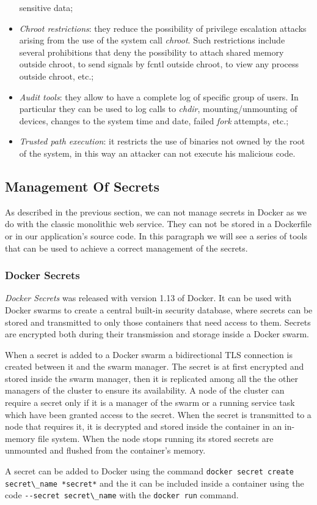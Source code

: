 \documentclass[a4paper,12pt]{article}
\newcommand{\code}[1]{\lstinline|#1|}
\begin{document}
\begin{itemize}
  sensitive data;
  \item \textit{Chroot restrictions}: they reduce the possibility of privilege escalation
  attacks arising from the use of the system call \textit{chroot}. Such
  restrictions include several prohibitions that deny the possibility to
  attach shared memory outside chroot, to send signals by fcntl outside chroot,
  to view any process outside chroot, etc.;
  \item \textit{Audit tools}: they allow to have a complete log of specific group of
  users. In particular they can be used to log calls to \textit{chdir},
  mounting/unmounting of devices, changes to the system time and date, failed
  \textit{fork} attempts, etc.;
  \item \textit{Trusted path execution}: it restricts the use of binaries not owned by
  the root of the system, in this way an attacker can not execute his malicious
  code.
\end{itemize}

\subsection{Management Of Secrets}

As described in the previous section, we can not manage secrets in Docker as we
do with the classic monolithic web service. They can not be stored in a
Dockerfile or in our application's source code. In this paragraph we will see a
series of tools that can be used to achieve a correct management of the secrets.

\subsubsection{Docker Secrets}

\textit{Docker Secrets} \cite{docker_secrets} was released with version 1.13 of
Docker. It can be used with Docker swarms to create a central built-in security
database, where secrets can be stored and transmitted to only those containers
that need access to them. Secrets are encrypted both during their transmission
and storage inside a Docker swarm. \par When a secret is added to a Docker swarm
a bidirectional TLS connection is created between it and the swarm manager. The
secret is at first encrypted and stored inside the swarm manager, then it is
replicated among all the the other managers of the cluster to ensure its
availability. A node of the cluster can require a secret only if it is a manager
of the swarm or a running service task which have been granted access to the
secret. When the secret is transmitted to a node that requires it, it is
decrypted and stored inside the container in an in-memory file system. When the
node stops running its stored secrets are unmounted and flushed from the
container's memory.\par A secret can be added to Docker using the command
\code{docker secret create secret\_name *secret*} and the it can be included
inside a container using the code \code{--secret secret\_name} with the \code{docker
run} command.
\end{document}
